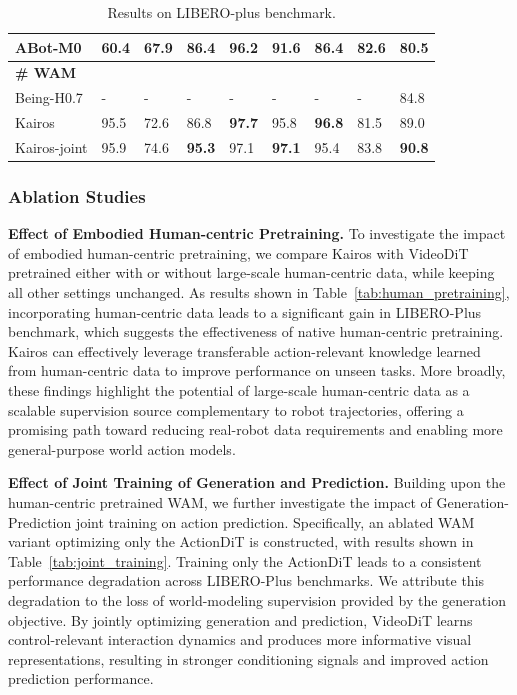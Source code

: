 \documentclass{llmxive}
\begin{document}
\begin{table}[t]
{\begin{tabular}{llllllll|l}
 ABot-M0 \citep{yang2026abotm0vlafoundationmodel}& 60.4& 67.9& 86.4 & 96.2 & 91.6& 86.4& 82.6&80.5\\
 \midrule
 \midrule
 \textbf{\# WAM}&       &&&&&&&\\
 Being-H0.7 \citep{beingbeyond2026beingh07}&       -&-&-&-&-&-&-&84.8\\
 \midrule
 \midrule
\rowcolor{gray!20} Kairos&       95.5&72.6&86.8&\textbf{97.7}&95.8&\textbf{96.8}&81.5&89.0\\
\rowcolor{gray!20} Kairos-joint&       95.9&74.6&\textbf{95.3}&97.1&\textbf{97.1}&95.4&83.8&\textbf{90.8}\\
\bottomrule
\end{tabular}
%
}
\caption{Results on LIBERO-plus benchmark.}
\label{tab:libero_plus_eval_results}
\end{table}

\subsubsection{Ablation Studies} 

\textbf{Effect of Embodied Human-centric Pretraining.} To investigate the impact of embodied human-centric pretraining, we compare Kairos with VideoDiT pretrained either with or without large-scale human-centric data, while keeping all other settings unchanged. As results shown in Table~\ref{tab:human_pretraining}, incorporating human-centric data leads to a significant gain in LIBERO-Plus benchmark, which suggests the effectiveness of native human-centric pretraining. Kairos can effectively leverage transferable action-relevant knowledge learned from human-centric data to improve performance on unseen tasks. More broadly, these findings highlight the potential of large-scale human-centric data as a scalable supervision source complementary to robot trajectories, offering a promising path toward reducing real-robot data requirements and enabling more general-purpose world action models.


\textbf{Effect of Joint Training of Generation and Prediction.} Building upon the human-centric pretrained WAM, we further investigate the impact of Generation-Prediction joint training on action prediction. Specifically, an ablated WAM variant optimizing only the ActionDiT is constructed, with results shown in Table~\ref{tab:joint_training}. Training only the ActionDiT leads to a consistent performance degradation across LIBERO-Plus benchmarks. We attribute this degradation to the loss of world-modeling supervision provided by the generation objective. By jointly optimizing generation and prediction, VideoDiT learns control-relevant interaction dynamics and produces more informative visual representations, resulting in stronger conditioning signals and improved action prediction performance.
\end{document}
